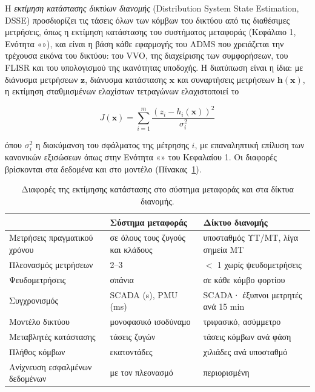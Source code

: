 Η \emph{εκτίμηση κατάστασης δικτύων διανομής} (Distribution System State Estimation, DSSE)
προσδιορίζει τις τάσεις όλων των κόμβων του δικτύου από τις διαθέσιμες μετρήσεις, όπως η
εκτίμηση κατάστασης του συστήματος μεταφοράς (Κεφάλαιο 1, Ενότητα «»), και
είναι η βάση κάθε εφαρμογής του ADMS που χρειάζεται την τρέχουσα εικόνα του δικτύου: του
VVO, της διαχείρισης των συμφορήσεων, του FLISR και του υπολογισμού της ικανότητας υποδοχής. Η διατύπωση είναι η ίδια: με
διάνυσμα μετρήσεων $\mathbf{z}$, διάνυσμα κατάστασης $\mathbf{x}$ και συναρτήσεις μετρήσεων
$\mathbf{h}(\mathbf{x})$, η εκτίμηση σταθμισμένων ελαχίστων τετραγώνων ελαχιστοποιεί το

\begin{equation}
J(\mathbf{x}) = \sum_{i=1}^{m} \frac{\left(z_i - h_i(\mathbf{x})\right)^2}{\sigma_i^2}
\label{eq:dsse-wls}
\end{equation}

όπου $\sigma_i^2$ η διακύμανση του σφάλματος της μέτρησης $i$, με επαναληπτική επίλυση των
κανονικών εξισώσεων όπως στην Ενότητα «» του Κεφαλαίου 1. Οι διαφορές
βρίσκονται στα δεδομένα και στο μοντέλο (Πίνακας~\ref{tab:dsse}).

\begin{table}[!htbp]
\centering
\begin{tabular}{lll}
\hline
 & Σύστημα μεταφοράς & Δίκτυο διανομής \\
\hline
Μετρήσεις πραγματικού χρόνου & σε όλους τους ζυγούς και κλάδους & υποσταθμός ΥΤ/ΜΤ, λίγα σημεία ΜΤ \\
Πλεονασμός μετρήσεων & 2--3 & $<$ 1 χωρίς ψευδομετρήσεις \\
Ψευδομετρήσεις & σπάνια & σε κάθε κόμβο φορτίου \\
Συγχρονισμός & SCADA (s), PMU (ms) & SCADA· έξυπνοι μετρητές ανά 15 min \\
Μοντέλο δικτύου & μονοφασικό ισοδύναμο & τριφασικό, ασύμμετρο \\
Μεταβλητές κατάστασης & τάσεις ζυγών & τάσεις κόμβων ανά φάση \\
Πλήθος κόμβων & εκατοντάδες & χιλιάδες ανά υποσταθμό \\
Ανίχνευση εσφαλμένων δεδομένων & με τον πλεονασμό & περιορισμένη \\
\hline
\end{tabular}
\caption{Διαφορές της εκτίμησης κατάστασης στο σύστημα μεταφοράς και στα δίκτυα διανομής.}
\label{tab:dsse}
\end{table}

